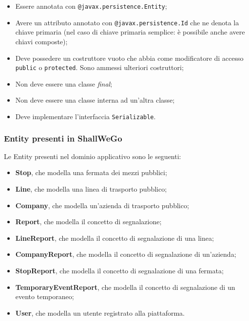         \begin{itemize}
            \item Essere annotata con \texttt{@javax.persistence.Entity};
            \item Avere un attributo annotato con \texttt{@javax.persistence.Id} che ne denota la chiave primaria (nel caso di chiave primaria semplice: è possibile anche avere chiavi composte);
            \item Deve possedere un costruttore vuoto che abbia come modificatore di accesso \texttt{public} o \texttt{protected}. Sono ammessi ulteriori costruttori;
            \item Non deve essere una classe \textit{final};
            \item Non deve essere una classe interna ad un'altra classe;
            \item Deve implementare l'interfaccia \texttt{Serializable}.
        \end{itemize}

        \subsubsection{Entity presenti in ShallWeGo}
        Le Entity presenti nel dominio applicativo sono le seguenti:

        \begin{itemize}
            \item \textbf{Stop}, che modella una fermata dei mezzi pubblici;
            \item \textbf{Line}, che modella una linea di trasporto pubblico;
            \item \textbf{Company}, che modella un'azienda di trasporto pubblico;
            \item \textbf{Report}, che modella il concetto di segnalazione;
            \item \textbf{LineReport}, che modella il concetto di segnalazione di una linea;
            \item \textbf{CompanyReport}, che modella il concetto di segnalazione di un'azienda;
            \item \textbf{StopReport}, che modella il concetto di segnalazione di una fermata;
            \item \textbf{TemporaryEventReport}, che modella il concetto di segnalazione di un evento temporaneo;
            \item \textbf{User}, che modella un utente registrato alla piattaforma.
        \end{itemize}


